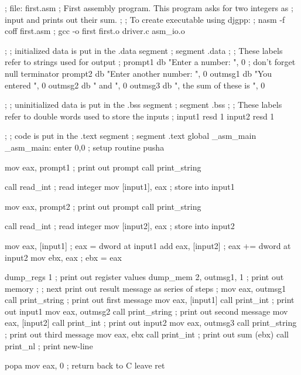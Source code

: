\begin{AsmCodeListing}[label=first.asm]
; file: first.asm
; First assembly program. This program asks for two integers as
; input and prints out their sum.
;
; To create executable using djgpp:
; nasm -f coff first.asm
; gcc -o first first.o driver.c asm_io.o

;
; initialized data is put in the .data segment
;
segment .data
;
; These labels refer to strings used for output
;
prompt1 db    "Enter a number: ", 0       ; don't forget null terminator
prompt2 db    "Enter another number: ", 0
outmsg1 db    "You entered ", 0
outmsg2 db    " and ", 0
outmsg3 db    ", the sum of these is ", 0

;
; uninitialized data is put in the .bss segment
;
segment .bss
;
; These labels refer to double words used to store the inputs
;
input1  resd 1
input2  resd 1

;
; code is put in the .text segment
;
segment .text
        global  _asm_main
_asm_main:
        enter   0,0               ; setup routine
        pusha

        mov     eax, prompt1      ; print out prompt
        call    print_string

        call    read_int          ; read integer
        mov     [input1], eax     ; store into input1

        mov     eax, prompt2      ; print out prompt
        call    print_string

        call    read_int          ; read integer
        mov     [input2], eax     ; store into input2

        mov     eax, [input1]     ; eax = dword at input1
        add     eax, [input2]     ; eax += dword at input2
        mov     ebx, eax          ; ebx = eax

        dump_regs 1                ; print out register values
        dump_mem  2, outmsg1, 1    ; print out memory
;
; next print out result message as series of steps
;
        mov     eax, outmsg1
        call    print_string      ; print out first message
        mov     eax, [input1]
        call    print_int         ; print out input1
        mov     eax, outmsg2
        call    print_string      ; print out second message
        mov     eax, [input2]
        call    print_int         ; print out input2
        mov     eax, outmsg3
        call    print_string      ; print out third message
        mov     eax, ebx
        call    print_int         ; print out sum (ebx)
        call    print_nl          ; print new-line

        popa
        mov     eax, 0            ; return back to C
        leave
        ret
\end{AsmCodeListing}

